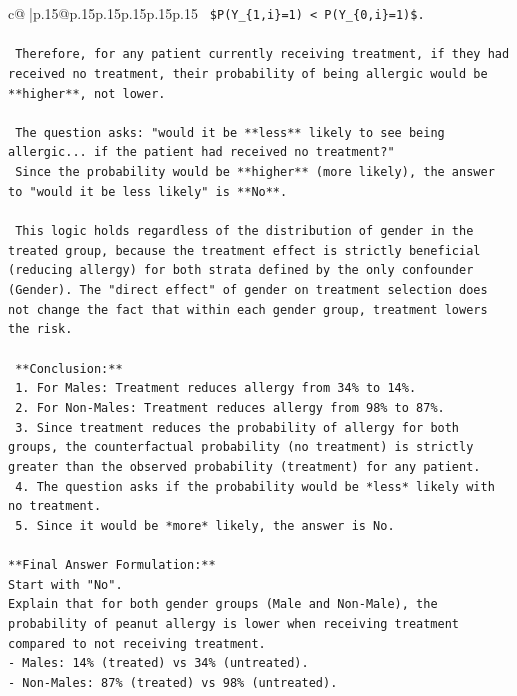 \documentclass{article}
\begin{document}
{\begin{supertabular}{c@{$\;$}|p{.15\linewidth}@{}p{.15\linewidth}p{.15\linewidth}p{.15\linewidth}p{.15\linewidth}p{.15\linewidth}}
{{{\texttt{    \$P(Y\_\{1,i\}=1) < P(Y\_\{0,i\}=1)\$.} \\
\\ 
\texttt{    Therefore, for any patient currently receiving treatment, if they had received no treatment, their probability of being allergic would be **higher**, not lower.} \\
\\ 
\texttt{    The question asks: "would it be **less** likely to see being allergic... if the patient had received no treatment?"} \\
\texttt{    Since the probability would be **higher** (more likely), the answer to "would it be less likely" is **No**.} \\
\\ 
\texttt{    This logic holds regardless of the distribution of gender in the treated group, because the treatment effect is strictly beneficial (reducing allergy) for both strata defined by the only confounder (Gender). The "direct effect" of gender on treatment selection does not change the fact that within each gender group, treatment lowers the risk.} \\
\\ 
\texttt{    **Conclusion:**} \\
\texttt{    1.  For Males: Treatment reduces allergy from 34\% to 14\%.} \\
\texttt{    2.  For Non{-}Males: Treatment reduces allergy from 98\% to 87\%.} \\
\texttt{    3.  Since treatment reduces the probability of allergy for both groups, the counterfactual probability (no treatment) is strictly greater than the observed probability (treatment) for any patient.} \\
\texttt{    4.  The question asks if the probability would be *less* likely with no treatment.} \\
\texttt{    5.  Since it would be *more* likely, the answer is No.} \\
\\ 
\texttt{**Final Answer Formulation:**} \\
\texttt{Start with "No".} \\
\texttt{Explain that for both gender groups (Male and Non{-}Male), the probability of peanut allergy is lower when receiving treatment compared to not receiving treatment.} \\
\texttt{{-} Males: 14\% (treated) vs 34\% (untreated).} \\
\texttt{{-} Non{-}Males: 87\% (treated) vs 98\% (untreated).} \\
}}}
\end{supertabular}}
\end{document}

